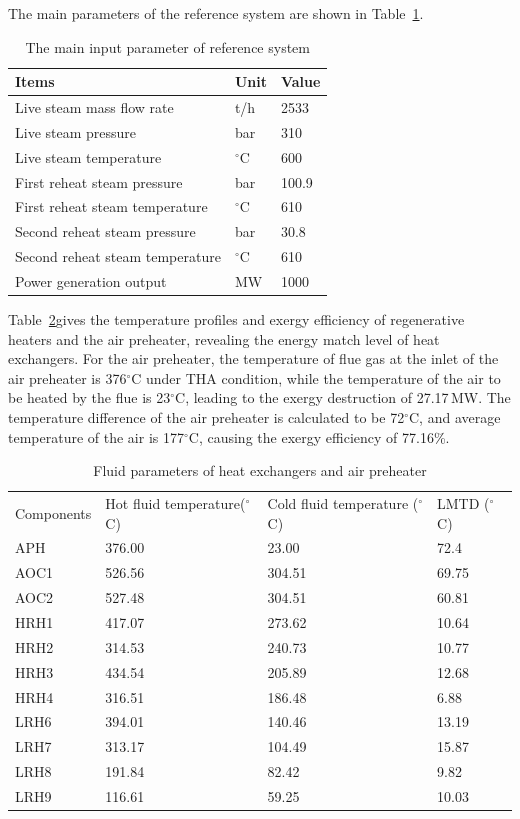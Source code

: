\documentclass[preprint,12pt]{elsarticle}
\begin{document}
The main  parameters of the reference system are shown in Table~\ref{tab:ref input}.

\begin{table}[htbp]
\caption{The main input parameter of reference system }
\label{tab:ref input}
\centering
\begin{tabular}{lll}
\toprule 
Items & Unit & Value\tabularnewline
\midrule
 Live steam mass flow rate 	    	&t/h 			&2533 \\
 Live steam pressure 		    	&bar 			&310\\
 Live steam temperature		     	&$^\circ$C		&600		\\
 First reheat steam pressure    	&bar			&100.9		\\
 First reheat steam temperature  	&$^\circ$C		&610		\\
 Second reheat steam pressure    	&bar			&30.8		\\
 Second reheat steam temperature 	&$^\circ$C		&610		\\
 Power generation output 			&MW				&1000		\\
\bottomrule
\end{tabular}	
\end{table}
Table~\ref{tab:reheater parameter}gives the temperature profiles and exergy efficiency of regenerative heaters and the air preheater, revealing the energy match level of heat exchangers.
For the air preheater, the temperature of flue gas at the inlet of the air preheater is 376$^\circ$C under THA condition, while the temperature of the air to be heated by the flue is 23$^\circ$C, leading to the exergy destruction of 27.17\,MW. The temperature difference of the air preheater is calculated to be 72$^\circ$C, and average temperature of the air is 177$^\circ$C, causing the exergy efficiency of 77.16\%.
\begin{table}[htbp]
\caption{Fluid parameters of heat exchangers and air preheater}
\label{tab:reheater parameter}
\centering
\begin{tabular}{llll}
\toprule 
\multirow{2}{2cm}{Components} &\multirow{2}{2.7cm}{Hot fluid temperature($^\circ$C)}  & \multirow{2}{3.2cm}{Cold fluid temperature ($^\circ$C)}&\multirow{2}{2.2cm}{LMTD ($^\circ$C)}\tabularnewline
&&&\tabularnewline
\midrule
APH  &  376.00 	& 23.00  & 72.4\tabularnewline
AOC1 &   526.56 & 304.51 & 69.75\tabularnewline
AOC2 &  527.48 	& 304.51 & 60.81\tabularnewline
HRH1 &   417.07 & 273.62 & 10.64\tabularnewline
HRH2 &   314.53 & 240.73 & 10.77\tabularnewline
HRH3 &   434.54 & 205.89 & 12.68\tabularnewline
HRH4 &   316.51 & 186.48 & 6.88\tabularnewline
LRH6 &  394.01 	& 140.46 & 13.19\tabularnewline
LRH7 &   313.17 & 104.49 & 15.87\tabularnewline
LRH8 &   191.84 & 82.42  & 9.82\tabularnewline
LRH9 &   116.61 & 59.25  & 10.03\tabularnewline
\bottomrule
\end{tabular}
\end{table}
\end{document}
